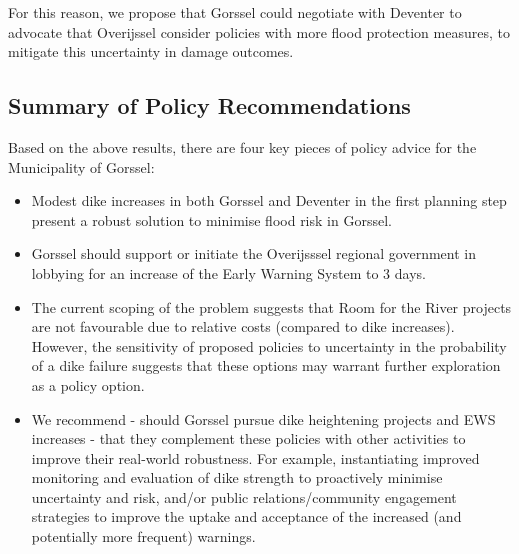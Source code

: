 For this reason, we propose that Gorssel could negotiate with Deventer to advocate that Overijssel consider policies with more flood protection measures, to mitigate this uncertainty in damage outcomes.


\subsection{Summary of Policy Recommendations}
Based on the above results, there are four key pieces of policy advice for the Municipality of Gorssel:
\begin{itemize}
    \item Modest dike increases in both Gorssel and Deventer in the first planning step present a robust solution to minimise flood risk in Gorssel.
    \item Gorssel should support or initiate the Overijsssel regional government in lobbying for an increase of the Early Warning System to 3 days.
    \item The current scoping of the problem suggests that Room for the River projects are not favourable due to relative costs (compared to dike increases). However, the sensitivity of proposed policies to uncertainty in the probability of a dike failure suggests that these options may warrant further exploration as a policy option.
    \item We recommend - should Gorssel pursue dike heightening projects and EWS increases - that they complement these policies with other activities to improve their real-world robustness. For example, instantiating improved monitoring and evaluation of dike strength to proactively minimise uncertainty and risk, and/or public relations/community engagement strategies to improve the uptake and acceptance of the increased (and potentially more frequent) warnings.
\end{itemize}